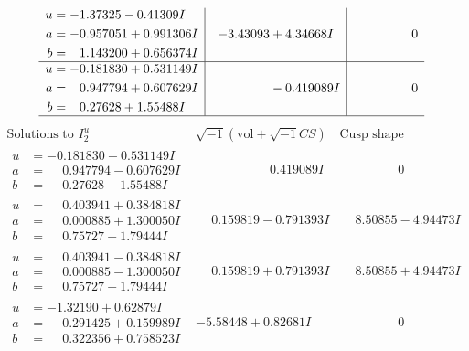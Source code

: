 \documentclass[1p]{elsarticle_modified}
\theoremstyle{definition}
\newcommand{\I}{\sqrt{-1}}
\begin{document}
$$\begin{array}{c|c|c}
\begin{aligned}
u &= -1.37325 - 0.41309 I \\
a &= -0.957051 + 0.991306 I \\
b &= \phantom{-}1.143200 + 0.656374 I\end{aligned}
 & -3.43093 + 4.34668 I & \phantom{-0.000000 } 0 \\ \hline\begin{aligned}
u &= -0.181830 + 0.531149 I \\
a &= \phantom{-}0.947794 + 0.607629 I \\
b &= \phantom{-}0.27628 + 1.55488 I\end{aligned}
 & \phantom{-0.000000 } -0.419089 I & \phantom{-0.000000 } 0\\
 \hline 
 \end{array}$$\newpage$$\begin{array}{c|c|c}  
\text{Solutions to }I^u_{2}& \I (\text{vol} + \sqrt{-1}CS) & \text{Cusp shape}\\
 \hline 
\begin{aligned}
u &= -0.181830 - 0.531149 I \\
a &= \phantom{-}0.947794 - 0.607629 I \\
b &= \phantom{-}0.27628 - 1.55488 I\end{aligned}
 & \phantom{-0.000000 -}0.419089 I & \phantom{-0.000000 } 0 \\ \hline\begin{aligned}
u &= \phantom{-}0.403941 + 0.384818 I \\
a &= \phantom{-}0.000885 + 1.300050 I \\
b &= \phantom{-}0.75727 + 1.79444 I\end{aligned}
 & \phantom{-}0.159819 - 0.791393 I & \phantom{-}8.50855 - 4.94473 I \\ \hline\begin{aligned}
u &= \phantom{-}0.403941 - 0.384818 I \\
a &= \phantom{-}0.000885 - 1.300050 I \\
b &= \phantom{-}0.75727 - 1.79444 I\end{aligned}
 & \phantom{-}0.159819 + 0.791393 I & \phantom{-}8.50855 + 4.94473 I \\ \hline\begin{aligned}
u &= -1.32190 + 0.62879 I \\
a &= \phantom{-}0.291425 + 0.159989 I \\
b &= \phantom{-}0.322356 + 0.758523 I\end{aligned}
 & -5.58448 + 0.82681 I & \phantom{-0.000000 } 0 \\ \hline\begin{aligned}

\end{aligned}
\end{array}$$
\end{document}
